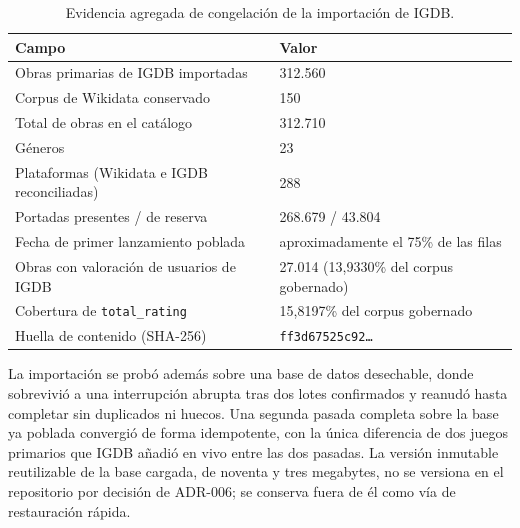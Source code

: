 \begin{table}[htp]
\centering
\begin{tabularx}{\textwidth}{ | L{0.60\textwidth} | Y | }
    \hline
    \textbf{Campo} & \textbf{Valor} \\
    \hline
    Obras primarias de IGDB importadas & 312.560 \\
    \hline
    Corpus de Wikidata conservado & 150 \\
    \hline
    Total de obras en el catálogo & 312.710 \\
    \hline
    Géneros & 23 \\
    \hline
    Plataformas (Wikidata e IGDB reconciliadas) & 288 \\
    \hline
    Portadas presentes / de reserva & 268.679 / 43.804 \\
    \hline
    Fecha de primer lanzamiento poblada & aproximadamente el 75\% de las filas \\
    \hline
    Obras con valoración de usuarios de IGDB & 27.014 (13,9330\% del corpus gobernado) \\
    \hline
    Cobertura de \texttt{total\_rating} & 15,8197\% del corpus gobernado \\
    \hline
    Huella de contenido (SHA-256) & \texttt{ff3d67525c92\ldots} \\
    \hline
\end{tabularx}
\caption{Evidencia agregada de congelación de la importación de IGDB.}
\label{tab:freeze}
\end{table}

La importación se probó además sobre una base de datos desechable, donde sobrevivió a una
interrupción abrupta tras dos lotes confirmados y reanudó hasta completar sin duplicados ni
huecos. Una segunda pasada completa sobre la base ya poblada convergió de forma idempotente,
con la única diferencia de dos juegos primarios que IGDB añadió en vivo entre las dos
pasadas. La versión inmutable reutilizable de la base cargada, de noventa y tres megabytes, no se
versiona en el repositorio por decisión de ADR-006; se conserva fuera de él como vía de
restauración rápida.

